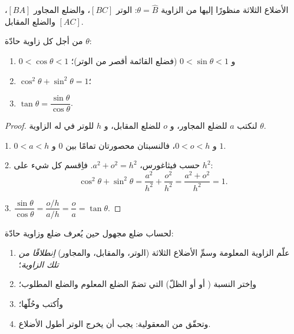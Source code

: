 \begin{omfigure}

{\small الأضلاع الثلاثة منظورًا إليها من الزاوية $\theta = \widehat B$:
الوتر $[BC]$، والضلع المجاور $[BA]$، والضلع المقابل $[AC]$.}
\end{omfigure}

\begin{proposition}\label{prop:g9:trig:properties}
من أجل كل زاوية حادّة $\theta$:
\begin{enumerate}
  \item $0 < \cos\theta < 1$ و $0 < \sin\theta < 1$ (فضلع القائمة
        أقصر من الوتر)؛
  \item $\cos^2\theta + \sin^2\theta = 1$؛
  \item $\tan\theta = \dfrac{\sin\theta}{\cos\theta}$.
\end{enumerate}
\end{proposition}

\begin{proof}
لنكتب $a$ للضلع المجاور، و $o$ للضلع المقابل، و $h$ للوتر في
 له الزاوية $\theta$.

1. $0 < a < h$ و $0 < o < h$، فالنسبتان محصورتان تمامًا بين
$0$ و $1$.

2. حسب فيثاغورس، $a^2 + o^2 = h^2$. فاِقسم كل شيء على $h^2$:
\[
\cos^2\theta + \sin^2\theta
= \frac{a^2}{h^2} + \frac{o^2}{h^2}
= \frac{a^2 + o^2}{h^2} = 1 .
\]

3. $\dfrac{\sin\theta}{\cos\theta} = \dfrac{o/h}{a/h} = \dfrac oa
= \tan\theta$.
\end{proof}

\begin{method}\label{met:g9:trig:side}
لحساب ضلع مجهول حين يُعرف ضلع وزاوية حادّة:
\begin{enumerate}
  \item علّم الزاوية المعلومة وسمِّ الأضلاع الثلاثة (الوتر،
        والمقابل، والمجاور) \emph{اِنطلاقًا من تلك الزاوية}؛
  \item واِختر النسبة ( أو  أو الظلّ) التي تضمّ
        الضلع المعلوم والضلع المطلوب؛
  \item واُكتب  وحُلّها؛
  \item وتحقّق من المعقولية: يجب أن يخرج الوتر أطول الأضلاع.
\end{enumerate}
\end{method}

